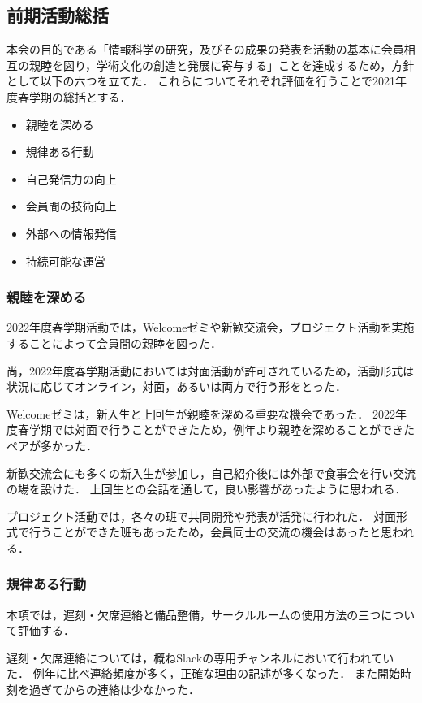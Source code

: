 \subsection*{前期活動総括}


本会の目的である「情報科学の研究，及びその成果の発表を活動の基本に会員相互の親睦を図り，学術文化の創造と発展に寄与する」ことを達成するため，方針として以下の六つを立てた．
これらについてそれぞれ評価を行うことで2021年度春学期の総括とする．

\begin{itemize}
  \item 親睦を深める
  \item 規律ある行動
  \item 自己発信力の向上
  \item 会員間の技術向上
  \item 外部への情報発信
  \item 持続可能な運営
\end{itemize}

\subsubsection*{親睦を深める}
2022年度春学期活動では，Welcomeゼミや新歓交流会，プロジェクト活動を実施することによって会員間の親睦を図った．

尚，2022年度春学期活動においては対面活動が許可されているため，活動形式は状況に応じてオンライン，対面，あるいは両方で行う形をとった．

Welcomeゼミは，新入生と上回生が親睦を深める重要な機会であった．
2022年度春学期では対面で行うことができたため，例年より親睦を深めることができたペアが多かった．

新歓交流会にも多くの新入生が参加し，自己紹介後には外部で食事会を行い交流の場を設けた．
上回生との会話を通して，良い影響があったように思われる．

プロジェクト活動では，各々の班で共同開発や発表が活発に行われた．
対面形式で行うことができた班もあったため，会員同士の交流の機会はあったと思われる．

\subsubsection*{規律ある行動}
本項では，遅刻・欠席連絡と備品整備，サークルルームの使用方法の三つについて評価する．

遅刻・欠席連絡については，概ねSlackの専用チャンネルにおいて行われていた．
例年に比べ連絡頻度が多く，正確な理由の記述が多くなった．
また開始時刻を過ぎてからの連絡は少なかった．

